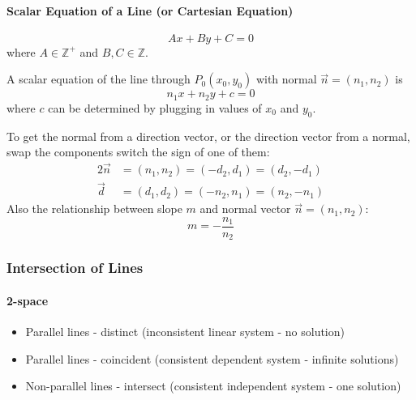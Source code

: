 \documentclass{report}
\newcommand\Z{\mathbb{Z}}
\theoremstyle{definition}
\numberwithin{equation}{section}
\begin{document}
\paragraph{Scalar Equation of a Line (or Cartesian Equation)}
\begin{equation}
	Ax+By+C = 0
\end{equation}
where $A \in \Z^+$ and $B,C \in \Z$.

\bigskip
\noindent
A scalar equation of the line through $P_0(x_0,y_0)$ with normal $\vec n = (n_1,n_2)$ is
\begin{equation}
	n_1x + n_2y + c = 0
\end{equation}
where $c$ can be determined by plugging in values of $x_0$ and $y_0$.

\bigskip \noindent
To get the normal from a direction vector, or the direction vector from a normal, swap the components switch the sign of one of them:
\begin{alignat*}{2}
	\vec n &= (n_1,n_2) = (-d_2, d_1) = (d_2, -d_1) \\
	\vec d &= (d_1,d_2) = (-n_2, n_1) = (n_2, -n_1)
\end{alignat*}
Also the relationship between slope $m$ and normal vector $\vec n = (n_1,n_2)$:
\begin{equation*}
	m = - \frac{n_1}{n_2}
\end{equation*}

\subsubsection{Intersection of Lines}
\paragraph{2-space}
\begin{itemize}
	\item Parallel lines - distinct (inconsistent linear system - no solution)
	\item Parallel lines - coincident (consistent dependent system - infinite solutions)
	\item Non-parallel lines - intersect (consistent independent system - one solution)
\end{itemize}
\end{document}
